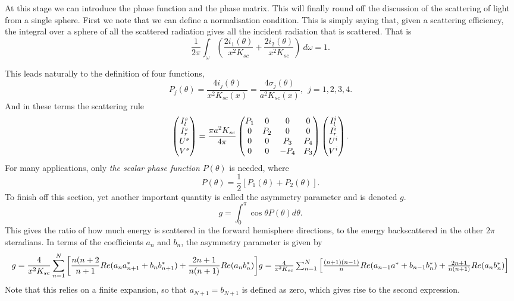\documentclass[12pt]{article}
\begin{document}
At this stage we can introduce the phase function and the phase matrix. This will finally round off the discussion of the scattering of light from a single sphere. First we note that we can define a normalisation condition. This is simply saying that, given a scattering efficiency, the integral over a sphere of all the scattered radiation gives all the incident radiation that is scattered.
That is
\begin{equation}
\frac{1}{2 \pi} \int_\omega \left ( \frac{2 i_1(\theta)}{x^2 K_{sc}}
 + \frac{2 i_2(\theta)}{x^2 K_{sc}} \right ) \> d \omega=1.
\end{equation}

This leads naturally to the definition of four functions,
\begin{equation}
P_j(\theta)=\frac{ 4 i_j(\theta)}{x^2 K_{sc}(x)}
=\frac{ 4 \sigma_j(\theta)}{a^2 K_{sc}(x)}, \> \> j=1,2,3,4.
\end{equation}
And in these terms the scattering rule
\begin{equation}
\begin{pmatrix} I^s_l \cr I^s_r \cr U^s \cr V^s \end{pmatrix}
=  \frac{\pi a^2 K_{sc} }{ 4\pi} \begin{pmatrix}
    P_1 & 0 & 0 & 0 \cr
    0 & P_2 & 0 & 0 \cr
    0 & 0 & P_3  & P_4 \cr
    0 & 0 & -P_4 &  P_3
\end{pmatrix}
\begin{pmatrix} I^i_l \cr I^i_r \cr U^i \cr V^i \end{pmatrix}.
\end{equation}
For many applications, only {\it the scalar phase function} $P(\theta) $ is needed, where
\begin{equation}
P(\theta)=\frac{1}{2}[P_1(\theta)+P_2(\theta)].
\end{equation}
To finish off this section, yet another important quantity is called the asymmetry parameter and is denoted $g$.
\begin{equation}
g=\int_0^{\pi} \cos \theta P(\theta) d\theta.
\end{equation}
This gives the ratio of how much energy is scattered in the forward hemisphere directions, to the energy backscattered in the other $2 \pi$ steradians.
In terms of the coefficients $a_n$ and $b_n$, the asymmetry parameter is given by
\begin{equation}
g= \frac{4}{ x^2 K_{sc}} \sum_{n=1}^{N} \left \lbrack
  \frac{n(n+2}{n+1} Re( a_n a_{n+1}^* +b_n b_{n+1}^*)
    + \frac{2n+1}{n(n+1)} Re(a_n b_n^*) \right \rbrack
$$   $$
g= \frac{4}{ x^2 K_{sc}} \sum_{n=1}^{N} \left \lbrack
  \frac{(n+1)(n-1)}{n} Re( a_{n-1} a^* +b_{n-1} b_n^*)
    + \frac{2n+1}{n(n+1)} Re(a_n b_n^*) \right \rbrack
\end{equation}
Note that this relies on a finite expansion, so that $a_{N+1}=b_{N+1}$ is defined as zero, which 
gives rise to the second expression.
\end{document}
